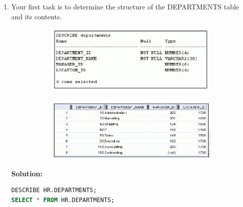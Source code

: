 \documentclass[a4paper,12pt]{article}
\begin{document}
\begin{enumerate}[start=4]
    \item Your first task is to determine the structure of the DEPARTMENTS table and its contents.
    \begin{figure}[h]
        \centering
        \begin{subfigure}[b]{0.45\linewidth}
            \centering
            \includegraphics[width=\linewidth]{graphics/4.1.png}
        \end{subfigure}
        \hspace{1em} %
        \begin{subfigure}[b]{0.45\linewidth}
            \centering
            \includegraphics[width=\linewidth]{graphics/4.2.png}
        \end{subfigure}
    \end{figure}
    
    \textbf{Solution: }
    \begin{lstlisting}[language=SQL]
DESCRIBE HR.DEPARTMENTS;
SELECT * FROM HR.DEPARTMENTS;
    \end{lstlisting}
    

\end{enumerate}
\end{document}

